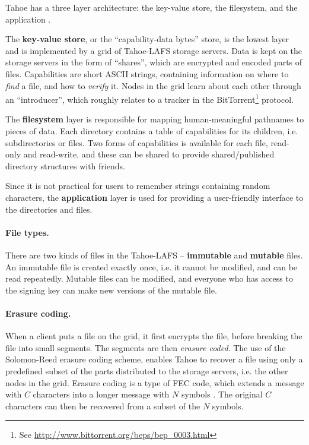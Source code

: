\documentclass[english,12pt,a4paper]{book}
\begin{document}
Tahoe has a three layer architecture: the key-value store, the filesystem, and
the application \cite{t_tahoe}.

The \textbf{key-value store}, or the ``capability-data bytes'' store, is the
lowest layer and is implemented by a grid of Tahoe-LAFS storage servers. Data is
kept on the storage servers in the form of ``shares'', which are encrypted and
encoded parts of files. Capabilities are short ASCII strings, containing
information on where to \emph{find} a file, and how to \emph{verify} it.
Nodes in the grid learn about each other through an ``introducer'', which
roughly relates to a tracker in the BitTorrent\footnote{See
\url{http://www.bittorrent.org/beps/bep\_0003.html}} protocol.

The \textbf{filesystem} layer is responsible for mapping human-meaningful
pathnames to pieces of data. Each directory contains a table of capabilities
for its children, i.e. subdirectories or files. Two forms of capabilities is
available for each file, read-only and read-write, and these can be shared to
provide shared/published directory structures with friends.

Since it is not practical for users to remember strings containing random
characters, the \textbf{application} layer is used for providing a user-friendly
interface to the directories and files.

\paragraph{File types.}

There are two kinds of files in the Tahoe-\ac{LAFS} -- \textbf{immutable} and
\textbf{mutable} files. An immutable file is created exactly once, i.e. it
cannot be modified, and can be read repeatedly. Mutable files can be modified,
and everyone who has access to the signing key can make new versions of
the mutable file.

\paragraph{Erasure coding.}

When a client puts a file on the grid, it first encrypts the file, before
breaking the file into small segments. The segments are then \emph{erasure
coded}.  The use of the Solomon-Reed erasure coding scheme, enables Tahoe to
recover a file using only a predefined subset of the parts distributed to the
storage servers, i.e. the other nodes in the grid. Erasure coding is a type of
\ac{FEC} code, which extends a message with $C$ characters into a longer message
with $N$ symbols \cite{t_reed-solomon}.  The original $C$ characters can then be
recovered from a subset of the $N$ symbols.
\end{document}
